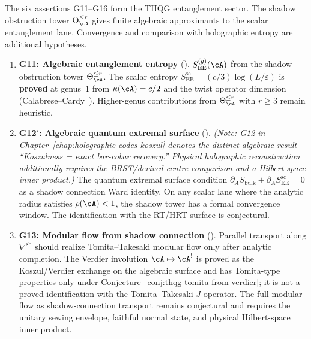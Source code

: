\begin{remark}
\label{rem:concordance-entanglement-programme}
The six assertions G11--G16 form the THQG entanglement sector.
The shadow obstruction tower
$\Theta_\cA^{\leq r}$ gives finite algebraic approximants to the
scalar entanglement lane. Convergence and comparison with holographic
entropy are additional hypotheses.

\begin{enumerate}[label=\textup{(\alph*)}]
\item \textbf{G11: Algebraic entanglement entropy}
 (\ClaimStatusHeuristic).
 $S_{\mathrm{EE}}^{(g)}(\cA)$ from the shadow obstruction tower
 $\Theta_\cA^{\leq r}$. The scalar entropy
 $S_{\mathrm{EE}}^{\mathrm{sc}} = (c/3)\log(L/\varepsilon)$
 is \textbf{proved} at genus~$1$ from $\kappa(\cA) = c/2$ and the
 twist operator dimension (Calabrese--Cardy~\cite{Calabrese-Cardy04}).
 Higher-genus contributions from $\Theta_\cA^{\leq r}$ with $r \geq 3$
 remain heuristic.

\item \textbf{G12$'$: Algebraic quantum extremal surface}
 (\ClaimStatusConjectured).
 \emph{(Note: G12 in
 Chapter~\textup{\ref{chap:holographic-codes-koszul}} denotes
 the distinct algebraic result ``Koszulness = exact bar-cobar
 recovery.'' Physical holographic reconstruction additionally requires
 the BRST/derived-centre comparison and a Hilbert-space inner product.)}
The quantum extremal surface condition
$\partial_A S_{\mathrm{bulk}} + \partial_A
S_{\mathrm{EE}}^{\mathrm{sc}} = 0$ as a shadow connection Ward
identity. On any scalar lane where the analytic radius satisfies
$\rho(\cA)<1$, the shadow tower has a formal convergence window. The
identification with the RT/HRT surface is conjectural.

\item \textbf{G13: Modular flow from shadow connection}
 (\ClaimStatusConjectured).
 Parallel transport along $\nabla^{\mathrm{sh}}$ should realize
 Tomita--Takesaki modular flow only after analytic completion.  The
 Verdier involution $\cA \mapsto \cA^!$ is proved as the
 Koszul/Verdier exchange on the algebraic surface and has
 Tomita-type properties only under
 Conjecture~\ref{conj:thqg-tomita-from-verdier}; it is not a proved
 identification with the Tomita--Takesaki $J$-operator.  The full
 modular flow as shadow-connection transport remains conjectural and
 requires the unitary sewing envelope, faithful normal state, and
 physical Hilbert-space inner product.


\end{enumerate}
\end{remark}
